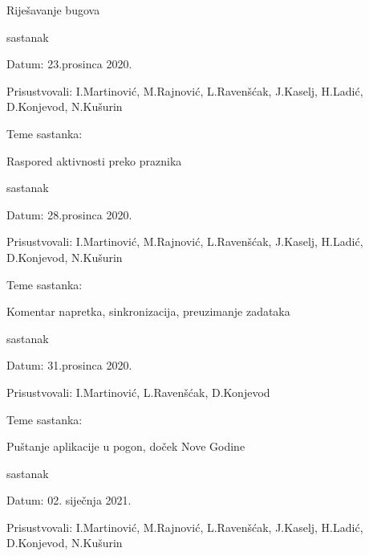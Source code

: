 \begin{packed_enum}
\begin{packed_item}
\begin{packed_item}
				\item   Riješavanje bugova
			\end{packed_item}
		\end{packed_item}
	\item sastanak
		\item[] \begin{packed_item}
			\item Datum: 23.prosinca 2020.
			\item Prisustvovali: I.Martinović, M.Rajnović, L.Ravenšćak, J.Kaselj, H.Ladić, D.Konjevod, N.Kušurin
			\item Teme sastanka: 
			\begin{packed_item}
				\item Raspored aktivnosti preko praznika  
			\end{packed_item}
		\end{packed_item}
	\item sastanak
		\item[] \begin{packed_item}
		\item Datum: 28.prosinca 2020.
		\item Prisustvovali: I.Martinović, M.Rajnović, L.Ravenšćak, J.Kaselj, H.Ladić, D.Konjevod, N.Kušurin
		\item Teme sastanka: 
		\begin{packed_item}
			\item   Komentar napretka, sinkronizacija, preuzimanje zadataka
		\end{packed_item}
		\end{packed_item}
	\item sastanak
		\item[] \begin{packed_item}
		\item Datum: 31.prosinca 2020.
		\item Prisustvovali: I.Martinović, L.Ravenšćak, D.Konjevod
		\item Teme sastanka: 
		\begin{packed_item}
			\item   Puštanje aplikacije u pogon, doček Nove Godine
		\end{packed_item}
	\end{packed_item}
   \item sastanak
				\item[] \begin{packed_item}
				\item Datum: 02. siječnja 2021.
				\item Prisustvovali: I.Martinović, M.Rajnović, L.Ravenšćak, J.Kaselj, H.Ladić, D.Konjevod, N.Kušurin

\end{packed_item}
\end{packed_enum}
